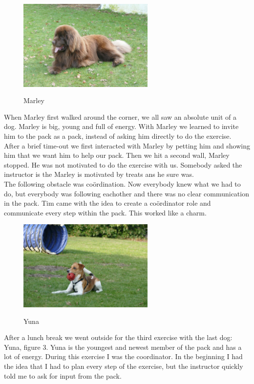 \documentclass{article}
\begin{document}
\begin{figure}[!h]
	\centering
	\includegraphics[width=0.6\textwidth]{sebastian}
	\label{fig:Sebastian}
	\caption{Marley}
\end{figure}
When Marley first walked around the corner, we all saw an absolute unit of a dog. Marley is big, young and full of energy. With Marley we learned to invite him to the pack as a pack, instead of asking him directly to do the exercise. \\

After a brief time-out we first interacted with Marley by petting him and showing him that we want him to help our pack. Then we hit a second wall, Marley stopped. He was not motivated to do the exercise with us. Somebody asked the instructor is the Marley is motivated by treats ans he sure was.\\

The following obstacle was coördination. Now everybody knew what we had to do, but everybody was following eachother and there was no clear communication in the pack. Tim came with the idea to create a coördinator role and communicate every step within the pack. This worked like a charm.\\

\begin{figure}[!h]
	\centering
	\includegraphics[width=0.6\textwidth]{yuna}
	\label{fig:Yuna}
	\caption{Yuna}
\end{figure}

After a lunch break we went outside for the third exercise with the last dog: Yuna, figure 3. Yuna is the youngest and newest member of the pack and has a lot of energy. During this exercise I was the coordinator. In the beginning I had the idea that I had to plan every step of the exercise, but the instructor quickly told me to ask for input from the pack. \\
\end{document}
